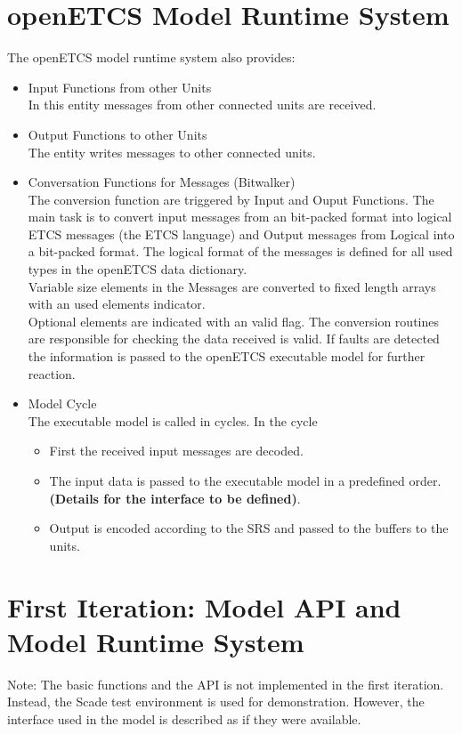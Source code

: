 \documentclass{template/openetcs_report}
\begin{document}
\section{openETCS Model Runtime System}
The openETCS model runtime system also provides:

\begin{itemize}
\item Input Functions from other Units\\
In this entity messages from other connected units are received.
\item Output Functions to other Units\\
The entity writes messages to other connected units.
\item Conversation Functions for Messages (Bitwalker)\\
The conversion function are triggered by Input and Ouput Functions. The main task is to convert input messages from an bit-packed format into logical ETCS messages (the ETCS language) and Output messages from Logical into a bit-packed format. The logical format of the messages is defined for all used types in the openETCS data dictionary. \\
Variable size elements in the Messages are converted to fixed length arrays with an used elements indicator.\\
Optional elements are indicated with an valid flag.
The conversion routines are responsible for checking the data received is valid. If  faults are detected the information is passed to the openETCS executable model for further reaction. 
\item Model Cycle\\
The executable model is called in cycles. In the cycle 
\begin{itemize}
\item First the received input messages are decoded.
\item The input data is passed to the executable model in a predefined order. \textbf{(Details for the interface to be defined)}.
\item Output is encoded according to the SRS and passed to the  buffers to the units.
\end{itemize}

\end{itemize}




\section{First Iteration: Model API and Model Runtime System}
Note: The basic functions and the API is not implemented in the first iteration. Instead, the Scade test environment is used for demonstration. However, the interface used in the model is described as if they were available.
\end{document}
